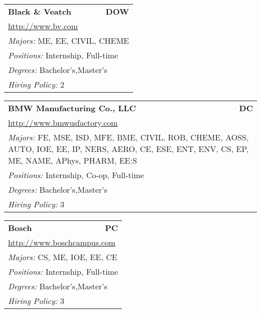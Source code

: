 \documentclass[twoside]{article}
\begin{document}
\begin{center}
\begin{multicols}{3}
\begin{FlushLeft}
\begin{minipage}{\columnwidth}
\end{minipage}
 
\begin{minipage}{\columnwidth}\begin{tabularx}{.95\columnwidth}{Xr}
                 {\Large\bf Black \& Veatch} & {\Large\bf DOW}\\
    \multicolumn{2}{p{.95\columnwidth}}{\url{http://www.bv.com}}\\
    \multicolumn{2}{p{.95\columnwidth}}{\emph{Majors:} ME, EE, CIVIL, CHEME}\\
    \multicolumn{2}{p{.95\columnwidth}}{\emph{Positions:} Internship, Full-time}\\
    \multicolumn{2}{p{.95\columnwidth}}{\emph{Degrees:} Bachelor's,Master's}\\
    \multicolumn{2}{p{.95\columnwidth}}{\emph{Hiring Policy:} 2}\\
    \end{tabularx}
    
\end{minipage}
 
\begin{minipage}{\columnwidth}\begin{tabularx}{.95\columnwidth}{Xr}
                 {\Large\bf BMW Manufacturing Co., LLC} & {\Large\bf DC}\\
    \multicolumn{2}{p{.95\columnwidth}}{\url{http://www.bmwusfactory.com}}\\
    \multicolumn{2}{p{.95\columnwidth}}{\emph{Majors:} FE, MSE, ISD, MFE, BME, CIVIL, ROB, CHEME, AOSS, AUTO, IOE, EE, IP, NERS, AERO, CE, ESE, ENT, ENV, CS, EP, ME, NAME, APhys, PHARM, EE:S}\\
    \multicolumn{2}{p{.95\columnwidth}}{\emph{Positions:} Internship, Co-op, Full-time}\\
    \multicolumn{2}{p{.95\columnwidth}}{\emph{Degrees:} Bachelor's,Master's}\\
    \multicolumn{2}{p{.95\columnwidth}}{\emph{Hiring Policy:} 3}\\
    \end{tabularx}
    
\end{minipage}
 
\begin{minipage}{\columnwidth}\begin{tabularx}{.95\columnwidth}{Xr}
                 {\Large\bf Bosch} & {\Large\bf PC}\\
    \multicolumn{2}{p{.95\columnwidth}}{\url{http://www.boschcampus.com}}\\
    \multicolumn{2}{p{.95\columnwidth}}{\emph{Majors:} CS, ME, IOE, EE, CE}\\
    \multicolumn{2}{p{.95\columnwidth}}{\emph{Positions:} Internship, Full-time}\\
    \multicolumn{2}{p{.95\columnwidth}}{\emph{Degrees:} Bachelor's,Master's}\\
    \multicolumn{2}{p{.95\columnwidth}}{\emph{Hiring Policy:} 3}\\
    \end{tabularx}
    

\end{minipage}
\end{FlushLeft}
\end{multicols}
\end{center}
\end{document}
